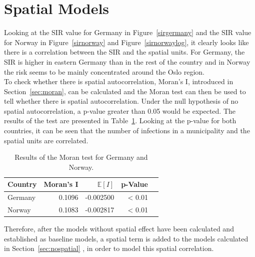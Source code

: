 \section{Spatial Models}\label{ch:spatial}
Looking at the SIR value for Germany in Figure~\ref{sirgermany} and the SIR value for Norway in Figure~\ref{sirnorway} and Figure~\ref{sirnorwaylog}, it clearly looks like there is a correlation between the SIR and the spatial units. For Germany, the SIR is higher in eastern Germany than in the rest of the country and in Norway the risk seems to be mainly concentrated around the Oslo region. \\
To check whether there is spatial autocorrelation, Moran's I, introduced in Section~\ref{sec:moran}, can be calculated and the Moran test can then be used to tell whether there is spatial autocorrelation. Under the null hypothesis of no spatial autocorrelation, a p-value greater than 0.05 would be expected. The results of the test are presented in Table~\ref{moranTest}. Looking at the p-value for both countries, it can be seen that the number of infections in a municipality and the spatial units are correlated.
\begin{table}[H] 
\caption{Results of the Moran test for Germany and Norway. \label{moranTest}}
\begin{tabular}{l r r r r}
\toprule
\textbf{Country} & \textbf{Moran's I}	& \textbf{$\mathbb{E}\left[I\right]$}	& \textbf{p-Value} \\
\midrule
Germany & 0.1096 & -0.002500 & < 0.01 \\
Norway & 0.1083 & -0.002817 & < 0.01 \\
\bottomrule
\end{tabular}
\end{table}
Therefore, after the models without spatial effect have been calculated and established as baseline models, a spatial term is added to the models calculated in Section~\ref{sec:nospatial} , in order to model this spatial correlation.
